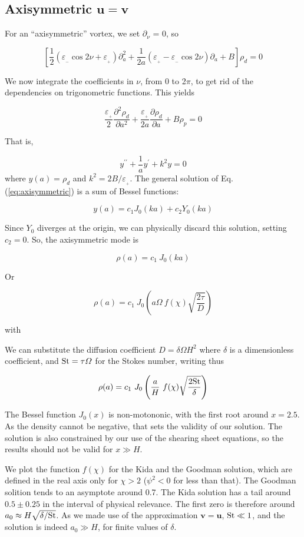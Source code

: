 \documentclass[apj]{emulateapj}
\newcommand{\pderiv}[2]{\frac{\partial #1}{\partial #2}}
\newcommand{\pderivn}[3]{\frac{\partial^{#3} #1}{\partial #2^{#3}}}
\renewcommand{\v}[1]{{\boldsymbol{#1}}} %
\newcommand{\Eq}[1]{Eq. (\ref{#1})}
\newcommand{\eq}[1]{\Eq{#1}}
\newcommand{\beq}{\begin{equation}}
\newcommand{\eeq}{\end{equation}}
\newcommand{\epsp}{\varepsilon_{_{+}}}
\newcommand{\epsm}{\varepsilon_{_{-}}}
\begin{document}


\subsection{Axisymmetric $\v{u} = \v{v}$ }

For an ``axisymmetric'' vortex, we set $\partial_\nu$ = 0, so 

\beq
\left[\frac{1}{2}\left( \epsm \cos 2\nu +\epsp\right) \partial^2_a   + \frac{1}{2a}\left( \epsp - \epsm\cos 2\nu\right) \partial_a  + B\right] \rho_d = 0 
\eeq

We now integrate the coefficients in $\nu$, from 0 to 2$\pi$, to get
rid of the dependencies on trigonometric functions. This yields

\beq
\frac{\epsp}{2}\pderivn{\rho_d}{a}{2} +
\frac{\epsp}{2a}\pderiv{\rho_d}{a} + B \rho_p = 0  
\eeq

That is, 

\beq
y^{\prime\prime} + \frac{1}{a}y^\prime + k^2 y = 0 
\label{eq:axisymmetric}
\eeq where $y(a) = \rho_d$ and $k^2 = 2B/\epsp$.  The general solution of \eq{eq:axisymmetric} is a
sum of Bessel functions: 

\beq
y(a) = c_1 J_0 (ka) + c_2 Y_0(ka) 
\eeq

Since  $Y_0$ diverges at the origin, we can physically discard 
this solution, setting $c_2=0$. So, the axisymmetric mode is

\beq\label{eq:axi}
\rho(a) = c_1 \ J_0 (ka)
\eeq

Or

\beq
\rho(a) = c_1 \ J_0 \left(a\varOmega \ f(\chi) \sqrt{\frac{2\tau}{D}} \right)
\eeq

\noindent with 


We can substitute the diffusion coefficient $D=\delta \varOmega H^2$ where 
$\delta$ is a dimensionless coefficient, and ${\rm St} = \tau\varOmega$ for 
the Stokes number, writing thus 

\beq
\rho(a) = c_1 \ J_0 \left(\frac{a}{H} \ f(\chi) \sqrt{\frac{2{\rm St}}{\delta}}\right)
\eeq 

The Bessel function $J_0(x)$ is
non-motononic, with the first root around $x=2.5$. As the density
cannot be negative, that sets the validity of our solution. The
solution is also constrained by our use of the shearing sheet
equations, so the results should not be valid for $x \gg H$. 
 
We plot the function $f(\chi)$ for the Kida and the Goodman
solution, which are defined in the real axis only for $\chi > 2$ ($\psi^2
< 0$ for less than that). The Goodman solition tends to an asymptote
around 0.7. The Kida solution has a  tail around $0.5\pm0.25$ in the
interval of physical relevance. The first zero is therefore around
$a_0 \approx H \sqrt{\delta/{\rm St}}$.  As we made use of the
approximation $\v{v}=\v{u}$, ${\rm St} \ll 1$, and the solution is indeed $a_0 \gg H$, for finite values of $\delta$.
\end{document}
